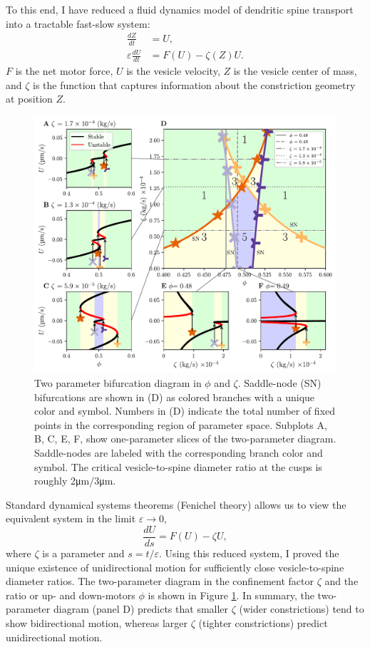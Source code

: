 \documentclass[a4paper,11pt]{article}
\newcommand{\ve}{\varepsilon}
\begin{document}
To this end, I have reduced a fluid dynamics model of dendritic spine transport into a tractable fast-slow system:
\begin{equation}\label{eq:fs1}
\begin{split}
\frac{dZ}{dt} &= U,\\
\ve\frac{dU}{dt} &= F(U) - \zeta(Z) U.
\end{split}
\end{equation}
$F$ is the net motor force, $U$ is the vesicle velocity, $Z$ is the vesicle center of mass, and $\zeta$ is the function that captures information about the constriction geometry at position $Z$.

\begin{figure}[ht!]
	\centering
	\includegraphics[width=\textwidth]{figures/bifurcations_colored.pdf}
	\caption{Two parameter bifurcation diagram in $\phi$ and $\zeta$. Saddle-node (SN) bifurcations are shown in (D) as colored branches with a unique color and symbol. Numbers in (D) indicate the total number of fixed points in the corresponding region of parameter space. Subplots A, B, C, E, F, show one-parameter slices of the two-parameter diagram. Saddle-nodes are labeled with the corresponding branch color and symbol. The critical vesicle-to-spine diameter ratio at the cusps is roughly 2\si{.\um}/3\si{.\um}.}\label{fig:2par}
\end{figure}

Standard dynamical systems theorems (Fenichel theory) allows us to view the equivalent system in the limit $\ve\rightarrow 0$,
\begin{equation*}
\frac{dU}{ds} = F(U) - \zeta U,
\end{equation*}
where $\zeta$ is a parameter and  $s=t/\ve$. Using this reduced system, I proved the unique existence of unidirectional motion for sufficiently close vesicle-to-spine diameter ratios. The two-parameter diagram in the confinement factor $\zeta$ and the ratio or up- and down-motors $\phi$ is shown in Figure \ref{fig:2par}. In summary, the two-parameter diagram (panel D) predicts that smaller $\zeta$ (wider constrictions) tend to show bidirectional motion, whereas larger $\zeta$ (tighter constrictions) predict unidirectional motion.
\end{document}
